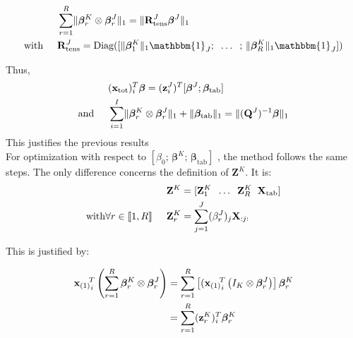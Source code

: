 \documentclass[preprint,12pt]{elsarticle}
\begin{document}
\begin{align}
                                & \sum\limits_{r = 1}^R \lVert \bm{\beta}_r^K \otimes \bm{\beta}_r^J \rVert_1 = \lVert \mathbf{R}_{\text{tens}}^J \bm{\beta}^J\rVert_1                             \\
    \text{with} \hspace{0.5 cm} & \mathbf{R}_{\text{tens}}^J = \text{Diag}([\lVert \bm{\beta}_1^K \rVert_1 \mathbbm{1}_J; \; \; \hdots \; \; ; \,  \lVert \bm{\beta}_R^K \rVert_1 \mathbbm{1}_J ])
\end{align}

\noindent Thus,
\begin{align}
                               & (\mathbf{x}_{\text{tot}})_i^T \bm{\beta}= (\mathbf{z}_i^J)^T [\bm{\beta}^J; \bm{\beta}_{\text{tab}}] \\
    \text{and} \hspace{0.5 cm} & \sum\limits_{i = 1}^I
    \lVert \bm{\beta}_r^K \otimes \bm{\beta}_r^J \rVert_1 + \lVert \bm{\beta}_{\text{tab}} \rVert_1= \lVert (\mathbf{Q}^J)^{-1} \bm{\beta} \rVert_1
\end{align}
This justifies the previous results\\[5 pt]
\noindent For optimization with respect to $\left[ \beta_0; \, \bm{\beta}^K; \, \bm{\beta}_{\text{tab}}  \right]$ , the method follows the same steps. The only difference concerns the definition of $\mathbf{Z}^K$. It is:
\begin{align}
                                                                         & \mathbf{Z}^K = [\mathbf{Z}_1^K \; \; \hdots \; \; \mathbf{Z}_R^K \; \; \mathbf{X}_{\text{tab}}] \\
    \text{with} \forall r \in \llbracket 1, R \rrbracket \hspace{0.5 cm} & \mathbf{Z}_r^K = \sum\limits_{j = 1}^J (\beta_r^J)_j \mathbf{X}_{:j:}
\end{align}

\noindent This is justified by:

\begin{align}
    {{\mathbf{x}_{(1)}}_i}^{\hspace{-5 pt} T}  \left( \sum\limits_{r = 1}^R \bm{\beta}_r^K \otimes \bm{\beta}_r^J \right) & = \sum\limits_{r = 1}^R \left[ ({{\mathbf{x}_{(1)}}_i}^{\hspace{-5 pt} T}  \left( I_K \otimes \bm{\beta}_r^J \right) \right] \bm{\beta}_r^K \\
                                                                                                                          & = \sum\limits_{r = 1}^R (\mathbf{z}_r^K)_i^T \bm{\beta}_r^K
\end{align}
\end{document}
